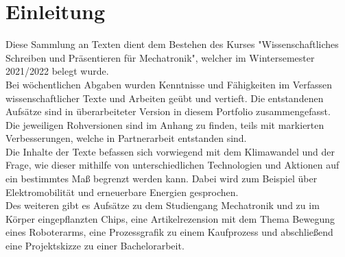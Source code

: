 \chapter{Einleitung}
Diese Sammlung an Texten dient dem Bestehen des Kurses "Wissenschaftliches Schreiben und Präsentieren für Mechatronik", welcher im Wintersemester 2021/2022 belegt wurde.\\
Bei wöchentlichen Abgaben wurden Kenntnisse und Fähigkeiten im Verfassen wissenschaftlicher Texte und Arbeiten geübt und vertieft. Die entstandenen Aufsätze sind in überarbeiteter Version in diesem Portfolio zusammengefasst. \\
Die jeweiligen Rohversionen sind im Anhang zu finden, teils mit markierten Verbesserungen, welche in Partnerarbeit entstanden sind.\\
Die Inhalte der Texte befassen sich vorwiegend mit dem Klimawandel und der Frage, wie dieser mithilfe von unterschiedlichen Technologien und Aktionen auf ein bestimmtes Maß begrenzt werden kann. Dabei wird zum Beispiel über Elektromobilität und erneuerbare Energien gesprochen.\\
Des weiteren gibt es Aufsätze zu dem Studiengang Mechatronik und zu im Körper eingepflanzten Chips, eine Artikelrezension mit dem Thema Bewegung eines Roboterarms, eine Prozessgrafik zu einem Kaufprozess und abschließend eine Projektskizze zu einer Bachelorarbeit.
